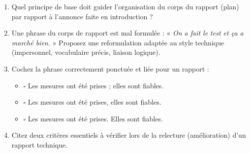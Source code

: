 \documentclass[11pt]{article}
\begin{document}
\begin{exercice}
\begin{enumerate}
    \item Quel principe de base doit guider l'organisation du corps du rapport (plan) par rapport à l'annonce faite en introduction ?
    \item Une phrase du corps de rapport est mal formulée : « \textit{On a fait le test et ça a marché bien.} » Proposez une reformulation adaptée au style technique (impersonnel, vocabulaire précis, liaison logique).
    \item Cochez la phrase correctement ponctuée et liée pour un rapport :
    \begin{itemize}
        \item[] $\square$ Les mesures ont été prises ; elles sont fiables.
        \item[] $\square$ Les mesures ont été prises, elles sont fiables.
        \item[] $\square$ Les mesures ont été prises. Elles sont fiables.
    \end{itemize}
    \item Citez deux critères essentiels à vérifier lors de la relecture (amélioration) d'un rapport technique.
\end{enumerate}
\end{exercice}
\end{document}
